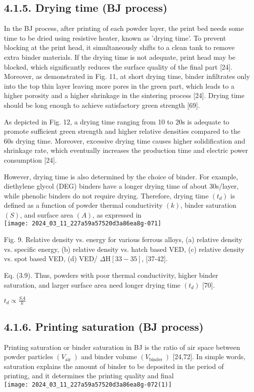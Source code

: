 \documentclass[10pt]{article}
\begin{document}
\subsection*{4.1.5. Drying time (BJ process)}
In the BJ process, after printing of each powder layer, the print bed needs some time to be dried using resistive heater, known as 'drying time'. To prevent blocking at the print head, it simultaneously shifts to a clean tank to remove extra binder materials. If the drying time is not adequate, print head may be blocked, which significantly reduces the surface quality of the final part [24]. Moreover, as demonstrated in Fig. 11, at short drying time, binder infiltrates only into the top thin layer leaving more pores in the green part, which leads to a higher porosity and a higher shrinkage in the sintering process [24]. Drying time should be long enough to achieve satisfactory green strength [69].

As depicted in Fig. 12, a drying time ranging from 10 to 20s is adequate to promote sufficient green strength and higher relative densities compared to the 60s drying time. Moreover, excessive drying time causes higher solidification and shrinkage rate, which eventually increases the production time and electric power consumption [24].

However, drying time is also determined by the choice of binder. For example, diethylene glycol (DEG) binders have a longer drying time of about 30s/layer, while phenolic binders do not require drying. Therefore, drying time $\left(t_{d}\right)$ is defined as a function of powder thermal conductivity $(k)$, binder saturation $(S)$, and surface area $(A)$, as expressed in\\
\texttt{[image: 2024\_03\_11\_227a59a57520d3a86ea8g-071]}

Fig. 9. Relative density vs. energy for various ferrous alloys, (a) relative density vs. specific energy, (b) relative density vs. hatch based VED, (c) relative density vs. spot based VED, (d) VED/ $\Delta \mathrm{H}[33-35]$, [37-42].

Eq. (3.9). Thus, powders with poor thermal conductivity, higher binder saturation, and larger surface area need longer drying time $\left(t_{d}\right)$ [70].

$t_{d} \propto \frac{S A}{k}$

\subsection*{4.1.6. Printing saturation (BJ process)}
Printing saturation or binder saturation in BJ is the ratio of air space between powder particles $\left(V_{\text {air }}\right)$ and binder volume $\left(V_{\text {binder }}\right)$ [24,72]. In simple words, saturation explains the amount of binder to be deposited in the period of printing, and it determines the printing quality and final\\
\texttt{[image: 2024\_03\_11\_227a59a57520d3a86ea8g-072(1)]}
\end{document}
